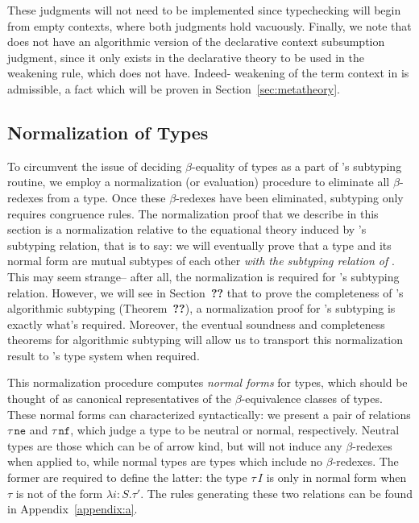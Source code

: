 These judgments will not need to be implemented since typechecking will begin from empty contexts, where both judgments hold vacuously. Finally, we note that \bilambdaamor does not have an algorithmic version of the declarative context subsumption judgment, since it only exists in the declarative theory to be used in the weakening rule, which \bilambdaamor does not have. Indeed- weakening of the term context in \bilambdaamor is admissible, a fact which will be proven in Section~\ref{sec:metatheory}.


\subsection{Normalization of Types}
To circumvent the issue of deciding $\beta$-equality of types as a part of \bilambdaamor's subtyping routine, we employ a normalization (or evaluation) procedure to eliminate all $\beta$-redexes from a type. Once these $\beta$-redexes have been eliminated, subtyping only requires congruence rules. The normalization proof that we describe in this section is a normalization relative to the equational theory induced by \dlambdaamor's subtyping relation, that is to say: we will eventually prove that a type and its normal form are mutual subtypes of each other \textit{with the subtyping relation of \dlambdaamor}. This may seem strange-- after all, the normalization is required for \bilambdaamor's subtyping relation. However, we will see in Section~\textbf{??} that to prove the completeness of \bilambdaamor's algorithmic subtyping (Theorem~\textbf{??}), a normalization proof for \dlambdaamor's subtyping is exactly what's required. Moreover, the eventual soundness and completeness theorems for algorithmic subtyping will allow us to transport this normalization result to \bilambdaamor's type system when required.

This normalization procedure computes \textit{normal forms} for types, which should be thought of as canonical representatives of the $\beta$-equivalence classes of types. These normal forms can characterized syntactically: we present a pair of relations $\tau \, \texttt{ne}$ and $\tau \, \texttt{nf}$, which judge a type to be neutral or normal, respectively. Neutral types are those which can be of arrow kind, but will not induce any $\beta$-redexes when applied to, while normal types are types which include no $\beta$-redexes. The former are required to define the latter: the type $\tau \, I$ is only in normal form when $\tau$ is not of the form $\lambda i : S.\tau'$. The rules generating these two relations can be found in Appendix~\ref{appendix:a}.

